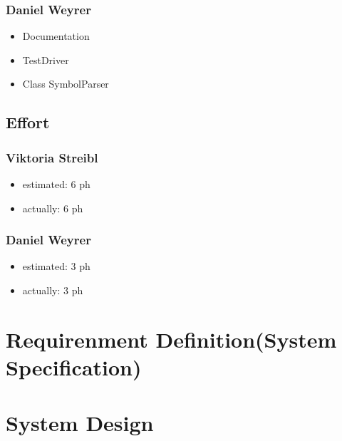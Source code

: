 \subsubsection{Daniel Weyrer}
\begin{itemize}
	\item Documentation
	\item TestDriver	
	\item Class SymbolParser
	
\end{itemize}

\subsection{Effort}

\subsubsection {Viktoria Streibl}
\begin{itemize}
	\item estimated: 6 ph 
	\item actually: 6 ph
\end{itemize}

\subsubsection {Daniel Weyrer}
\begin{itemize}
	\item estimated: 3 ph 
	\item actually: 3 ph
\end{itemize}

\section{Requirenment Definition(System Specification)}


\section{System Design}
